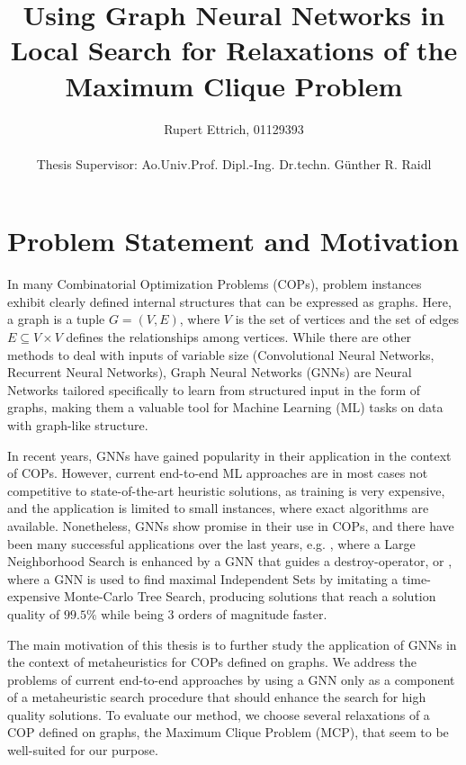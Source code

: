 \documentclass[11pt]{article}
\title{Using Graph Neural Networks in Local Search for Relaxations of the Maximum Clique Problem}
\author{Rupert Ettrich, 01129393 \\\\ Thesis Supervisor: Ao.Univ.Prof. Dipl.-Ing. Dr.techn. Günther R. Raidl}
\date{}
\begin{document}
	
\maketitle 
 
\section{Problem Statement and Motivation}

In many Combinatorial Optimization Problems (COPs), problem instances exhibit clearly defined internal structures that can be expressed as graphs. Here, a graph is a tuple $G = (V, E)$, where $V$ is the set of vertices and the set of edges $E \subseteq V \times V$ defines the relationships among vertices. While there are other methods to deal with inputs of variable size (Convolutional Neural Networks, Recurrent Neural Networks), Graph Neural Networks (GNNs) are Neural Networks tailored specifically to learn from structured input in the form of graphs, making them a valuable tool for Machine Learning (ML) tasks on data with graph-like structure.   

In recent years, GNNs have gained popularity in their application in the context of COPs. However, current end-to-end ML approaches are in most cases not competitive to state-of-the-art heuristic solutions, as training is very expensive, and the application is limited to small instances, where exact algorithms are available. Nonetheless, GNNs show promise in their use in COPs, and there have been many successful applications over the last years, e.g. 
\cite{Oberweger2022}, where a Large Neighborhood Search is enhanced by a GNN that guides a destroy-operator, or \cite{NEURIPS2021_0db2e204}, where a GNN is used to find maximal Independent Sets by imitating a time-expensive Monte-Carlo Tree Search, producing solutions that reach a solution quality of $99.5\%$ while being 3 orders of magnitude faster. 

The main motivation of this thesis is to further study the application of GNNs in the context of metaheuristics for COPs defined on graphs. We address the problems of current end-to-end approaches by using a GNN only as a component of a metaheuristic search procedure that should enhance the search for high quality solutions. To evaluate our method, we choose several relaxations of a COP defined on graphs, the Maximum Clique Problem (MCP), that seem to be well-suited for our purpose. 
\end{document}
